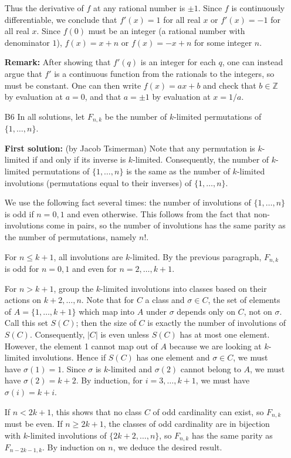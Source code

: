 \documentclass[amssymb,twocolumn,pra,10pt,aps]{revtex4-1}
\newcommand{\ZZ}{\mathbb{Z}}
\begin{document}
\begin{itemize}
Thus the derivative of $f$ at any rational number is $\pm 1$. Since $f$ is continuously differentiable, we conclude that $f'(x) = 1$ for all real $x$ or $f'(x) = -1$ for all real $x$. Since $f(0)$ must be an integer (a rational number with denominator $1$), $f(x)=x+n$ or $f(x)=-x+n$ for some integer $n$.

\textbf{Remark:}
After showing that $f'(q)$ is an integer for each $q$, one can instead
argue that $f'$ is a continuous function from the rationals to the integers,
so must be constant. One can then write $f(x) = ax+b$ and check that
$b \in \ZZ$ by evaluation at $a=0$, and that $a= \pm 1$ by evaluation at
$x=1/a$.

\item[B6]
In all solutions,
let $F_{n,k}$ be the number of $k$-limited permutations of
$\{1,\dots,n\}$.

\textbf{First solution:}
(by Jacob Tsimerman)
Note that any permutation is $k$-limited if and only if its inverse is
$k$-limited. Consequently, the number of $k$-limited permutations of
$\{1,\dots,n\}$ is the same as the number of $k$-limited involutions
(permutations equal to their inverses) of $\{1,\dots,n\}$.

We use the following fact several times: the number of involutions
of $\{1,\dots,n\}$ is odd if $n=0,1$ and even otherwise. This follows from
the fact that non-involutions come in pairs, so the number of involutions
has the same parity as the number of permutations, namely $n!$.

For $n \leq k+1$, all involutions are $k$-limited.
By the previous paragraph, $F_{n,k}$ is odd for $n=0,1$ and even for
$n=2,\dots,k+1$.

For $n > k+1$, group the  $k$-limited involutions into classes based on
their actions on $k+2,\dots,n$. Note that for $C$ a class and $\sigma \in C$,
the set of elements of $A = \{1,\dots,k+1\}$ which map into $A$ under
$\sigma$ depends only on $C$, not on $\sigma$. Call this set $S(C)$; then
the size of $C$ is exactly the number of involutions of $S(C)$.
Consequently, $|C|$ is even unless $S(C)$ has at most one element.
However, the element 1 cannot map out of $A$ because we are looking at
$k$-limited involutions. Hence if $S(C)$ has one element and $\sigma \in C$,
we must have $\sigma(1) = 1$. Since $\sigma$ is $k$-limited and
$\sigma(2)$ cannot belong to $A$, we must have $\sigma(2) = k+2$. By
induction, for $i=3,\dots,k+1$, we must have  $\sigma(i) = k+i$.

If $n < 2k+1$, this shows that no class $C$ of odd cardinality can exist,
so $F_{n,k}$ must be even. If $n \geq 2k+1$, the classes of odd cardinality
are in bijection with $k$-limited involutions of $\{2k+2,\dots,n\}$,
so $F_{n,k}$ has the same parity as $F_{n-2k-1,k}$. By induction on $n$,
we deduce the desired result.


\end{itemize}
\end{document}

